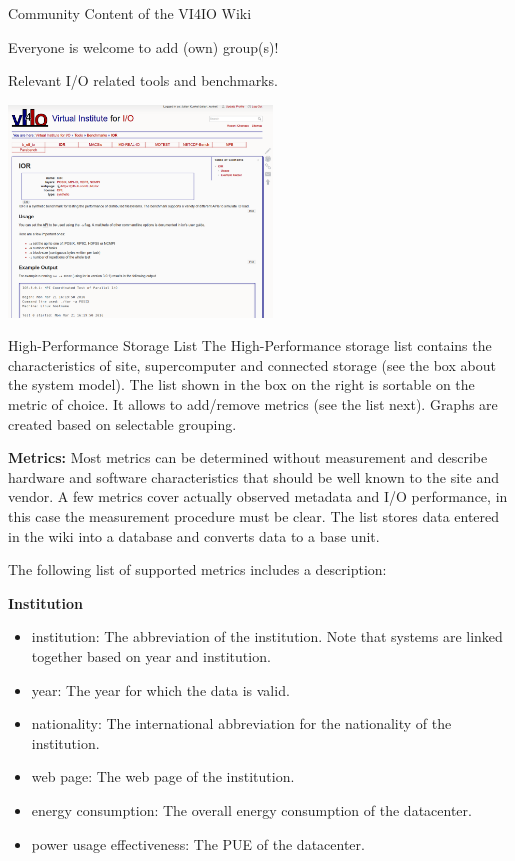 \documentclass[portrait,a0paper,fontscale=0.4]{baposter}
\newcommand{\compresslist}{%
\setlength{\itemsep}{1pt}%
\setlength{\parskip}{0pt}%
\setlength{\parsep}{0pt}%
}
\begin{document}
\begin{poster}
\begin{posterbox}[name=concept,column=1,span=2]{Community Content of the VI4IO Wiki}
\begin{minipage}{7cm}
Everyone is welcome to add (own) group(s)!

\end{minipage}
\hfill
\begin{minipage}{7.5cm}

Relevant I/O related tools and benchmarks.

\vspace*{1em}

\includegraphics[width=7cm]{benchmark}
\end{minipage}
\end{posterbox}


\begin{posterbox}[name=schedule,column=1,span=2, below=concept]{High-Performance Storage List}
The High-Performance storage list contains the characteristics of site, supercomputer and connected storage (see the box about the system model).
The list shown in the box on the right is sortable on the metric of choice.
It allows to add/remove metrics (see the list next).
Graphs are created based on selectable grouping.


\textbf{Metrics:} Most metrics can be determined without measurement and describe hardware and software characteristics that should be well known to the site and vendor. A few metrics cover actually observed metadata and I/O performance, in this case the measurement procedure must be clear.
The list stores data entered in the wiki into a database and converts data to a base unit.

The following list of supported metrics includes a description:

\begin{minipage}{0.48\textwidth}
\textbf{Institution}
\scriptsize
\begin{itemize}\compresslist
\item institution: The abbreviation of the institution. Note that systems are linked together based on year and institution.
\item year: The year for which the data is valid.
\item nationality: The international abbreviation for the nationality of the institution.
\item web page: The web page of the institution.
\item energy consumption: The overall energy consumption of the datacenter.
\item power usage effectiveness: The PUE of the datacenter.
\end{itemize}


\end{minipage}
\end{posterbox}
\end{poster}
\end{document}
